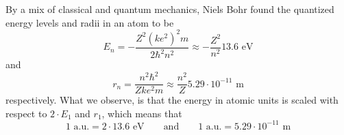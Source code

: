 By a mix of classical and quantum mechanics, Niels Bohr found the quantized energy levels and radii in an atom to be
\begin{equation}
E_n=-\frac{Z^2(ke^2)^2m}{2\hbar^2n^2}\approx-\frac{Z^2}{n^2}13.6\text{ eV}
\end{equation}
and
\begin{equation}
r_n=\frac{n^2\hbar^2}{Zke^2m}\approx\frac{n^2}{Z}5.29\cdot10^{-11}\text{ m}
\end{equation}
respectively. What we observe, is that the energy in atomic units is scaled with respect to $2\cdot E_1$ and $r_1$, which means that
\begin{equation}
1\text{ a.u.} = 2\cdot13.6\text{ eV}\quad\quad\text{and}\quad\quad 1 \text{ a.u.} = 5.29\cdot10^{-11}\text{ m}
\end{equation}